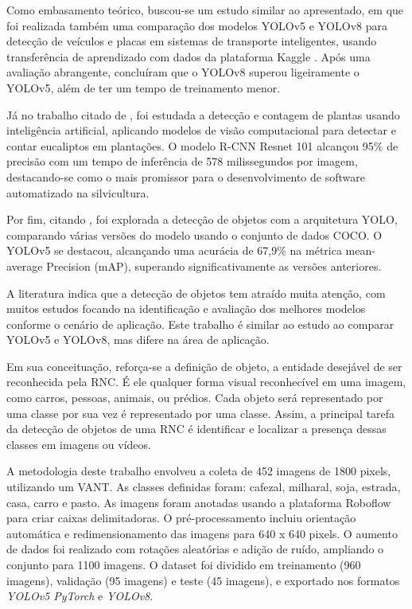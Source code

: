 Como embasamento teórico, buscou-se um estudo similar ao apresentado, em que foi realizada também uma comparação dos modelos YOLOv5 e YOLOv8 para detecção de veículos e placas em sistemas de transporte inteligentes, usando transferência de aprendizado com dados da plataforma Kaggle \cite{afonso2023vehicle}. Após uma avaliação abrangente, concluíram que o YOLOv8 superou ligeiramente o YOLOv5, além de ter um tempo de treinamento menor.

Já no trabalho citado de \cite{silva2018detecccao}, foi estudada a detecção e contagem de plantas usando inteligência artificial, aplicando modelos de visão computacional para detectar e contar eucaliptos em plantações. O modelo R-CNN Resnet 101 alcançou 95\% de precisão com um tempo de inferência de 578 milissegundos por imagem, destacando-se como o mais promissor para o desenvolvimento de software automatizado na silvicultura.

Por fim, citando \cite{gomes2022detecccao}, foi explorada a detecção de objetos com a arquitetura YOLO, comparando várias versões do modelo usando o conjunto de dados COCO. O YOLOv5 se destacou, alcançando uma acurácia de 67,9\% na métrica mean-average Precision (mAP), superando significativamente as versões anteriores.

A literatura indica que a detecção de objetos tem atraído muita atenção, com muitos estudos focando na identificação e avaliação dos melhores modelos conforme o cenário de aplicação. Este trabalho é similar ao estudo \cite{afonso2023vehicle} ao comparar YOLOv5 e YOLOv8, mas difere na área de aplicação.

Em sua conceituação, reforça-se a definição de objeto, a entidade desejável de ser reconhecida pela RNC. É ele qualquer forma visual reconhecível em uma imagem, como carros, pessoas, animais, ou prédios. Cada objeto será representado por uma classe por sua vez é representado por uma classe. Assim, a principal tarefa da detecção de objetos de uma RNC é identificar e localizar a presença dessas classes em imagens ou vídeos.

A metodologia deste trabalho envolveu a coleta de 452 imagens de 1800 pixels, utilizando um VANT. As classes definidas foram: cafezal, milharal, soja, estrada, casa, carro e pasto. As imagens foram anotadas usando a plataforma Roboflow para criar caixas delimitadoras. O pré-processamento incluiu orientação automática e redimensionamento das imagens para 640 x 640 pixels. O aumento de dados foi realizado com rotações aleatórias e adição de ruído, ampliando o conjunto para 1100 imagens. O dataset foi dividido em treinamento (960 imagens), validação (95 imagens) e teste (45 imagens), e exportado nos formatos \textit{YOLOv5 PyTorch} e \textit{YOLOv8}.

